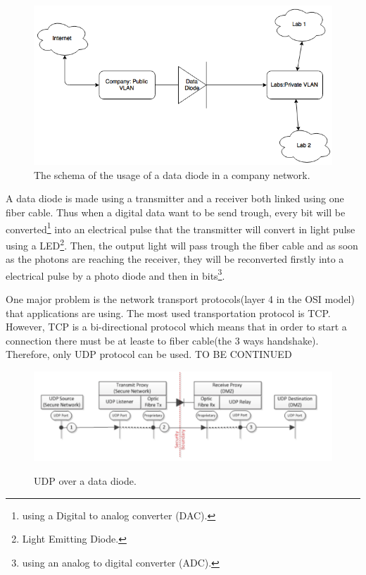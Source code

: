 \documentclass[a4paper,10pt]{article}
\begin{document}
\begin{figure}
\centering
\includegraphics[scale=0.45]{images/dataDiode.png}
\caption{The schema of the usage of a data diode in a company network.}
\label{fig:datadiode}
\end{figure}

A data diode is made using a transmitter and a receiver both linked using one fiber cable. Thus when a digital data want to be send trough, every bit will be converted\footnote{using a Digital to analog converter (DAC).} into an electrical pulse that the transmitter will convert in light pulse using a LED\footnote{Light Emitting Diode.}. Then, the output light will pass trough the fiber cable and as soon as the photons are reaching the receiver, they will be reconverted firstly into a electrical pulse by a photo diode and then in bits\footnote{using an analog to digital converter (ADC).}.

One major problem is the network transport protocols(layer 4 in the OSI model) that applications are using. The most used transportation protocol is TCP. However, TCP is a bi-directional protocol which means that in order to start a connection there must be at leaste to fiber cable(the 3 ways handshake). Therefore, only UDP protocol can be used. TO BE CONTINUED 
\begin{figure}
\centering
\includegraphics[scale=0.5]{images/UDPOverDD.png}
\label{fig:UDPDD}
\caption{UDP over a data diode.}
\end{figure}
\end{document}
